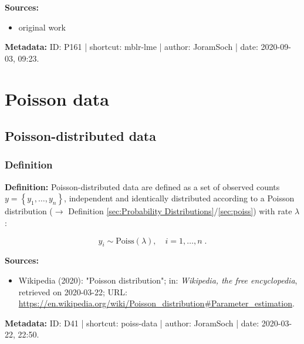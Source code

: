 \documentclass[a4paper,12pt,twoside]{book}
\begin{document}
\vspace{1em}
\textbf{Sources:}
\begin{itemize}
\item original work\end{itemize}


\vspace{1em}
\textbf{Metadata:} ID: P161 | shortcut: mblr-lme | author: JoramSoch | date: 2020-09-03, 09:23.
\vspace{1em}



\pagebreak
\section{Poisson data}

\subsection{Poisson-distributed data}

\subsubsection[\textit{Definition}]{Definition} \label{sec:poiss-data}
\setcounter{equation}{0}

\textbf{Definition:} Poisson-distributed data are defined as a set of observed counts $y = \left\lbrace y_1, \ldots, y_n \right\rbrace$, independent and identically distributed according to a Poisson distribution ($\rightarrow$ Definition \ref{sec:Probability Distributions}/\ref{sec:poiss}) with rate $\lambda$:

\begin{equation} \label{eq:poiss-data-Poiss}
y_i \sim \mathrm{Poiss}(\lambda), \quad i = 1, \ldots, n \; .
\end{equation}


\vspace{1em}
\textbf{Sources:}
\begin{itemize}
\item Wikipedia (2020): "Poisson distribution"; in: \textit{Wikipedia, the free encyclopedia}, retrieved on 2020-03-22; URL: \url{https://en.wikipedia.org/wiki/Poisson_distribution#Parameter_estimation}.
\end{itemize}


\vspace{1em}
\textbf{Metadata:} ID: D41 | shortcut: poiss-data | author: JoramSoch | date: 2020-03-22, 22:50.
\vspace{1em}
\end{document}
